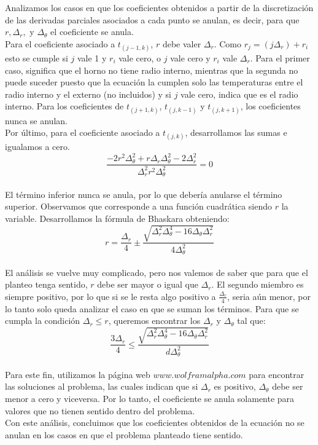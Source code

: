 Analizamos los casos en que los coeficientes obtenidos a partir de la discretización de las derivadas parciales asociados a cada punto se anulan, es decir, para que $r, \Delta_r,$ y $\Delta_\theta$ el coeficiente se anula. \\
Para el coeficiente asociado a $t_{(j-1, k)}$, $r$ debe valer $\Delta_r$. Como $r_j = (j \Delta_r) + r_i$ esto se cumple si $j$ vale 1 y $r_i$ vale cero, o $j$ vale cero y $r_i$ vale $\Delta_r$. Para el primer caso, significa que el horno no tiene radio interno, mientras que la segunda no puede suceder puesto que la ecuación la cumplen solo las temperaturas entre el radio interno y el externo (no incluidos) y si $j$ vale cero, indica que es el radio interno.
Para los coeficientes de $t_{(j+1, k)}$, $t_{(j, k-1)}$ y $t_{(j, k+1)}$, los coeficientes nunca se anulan. \\
Por último, para el coeficiente asociado a $t_{(j, k)}$, desarrollamos las sumas e igualamos a cero. \\
$$\frac{-2r^2 \Delta^2_\theta + r \Delta_r \Delta^2_\theta - 2 \Delta^2_r}{\Delta^2_r r^2 \Delta^2_\theta} = 0$$\\
El término inferior nunca se anula, por lo que debería anularse el término superior. Observamos que corresponde a una función cuadrática siendo $r$ la variable. Desarrollamos la fórmula de Bhaskara obteniendo: \\
$$r = \frac{\Delta_r}{4} \pm \frac{\sqrt{\Delta^2_r \Delta^4_\theta - 16 \Delta_\theta \Delta^2_r}}{4 \Delta^2_\theta}$$ \\
El análisis se vuelve muy complicado, pero nos valemos de saber que para que el planteo tenga sentido, $r$ debe ser mayor o igual que $\Delta_r$.
El segundo miembro es siempre positivo, por lo que si se le resta algo positivo a $\frac{\Delta_r}{4}$, seria aún menor, por lo tanto solo queda analizar el caso en que se suman los términos. Para que se cumpla la condición $\Delta_r \leq r$, queremos encontrar los $\Delta_r$ y $\Delta_\theta$ tal que: \\
$$\frac{3 \Delta_r}{4}  \leq \frac{\sqrt{\Delta^2_r \Delta^4_\theta - 16 \Delta_\theta \Delta^2_r}}{d \Delta^2_\theta} $$ \\
Para este fin, utilizamos la página web $www.wolframalpha.com$ para encontrar las soluciones al problema, las cuales indican que si $\Delta_r$ es positivo, $\Delta_\theta$ debe ser menor a cero y viceversa. Por lo tanto, el coeficiente se anula solamente para valores que no tienen sentido dentro del problema. \\
Con este análisis, concluimos que los coeficientes obtenidos de la ecuación no se anulan en los casos en que el problema planteado tiene sentido.

